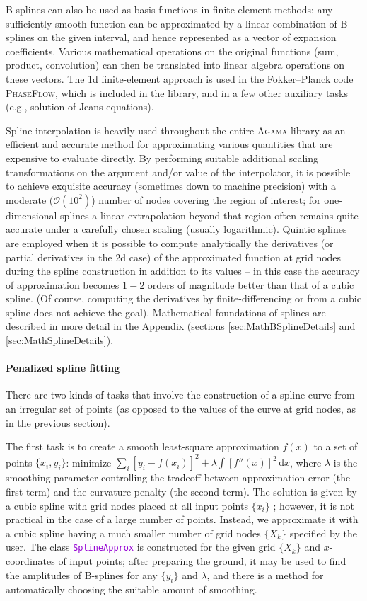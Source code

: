\documentclass[12pt]{article}
\newcommand{\Agama}{\textsc{Agama}\xspace}
\newcommand{\ttt}[1]{\textcolor{darkviolet}{\texttt{#1}}}
\renewcommand{\d}{\mathrm{d}}
\begin{document}
B-splines can also be used as basis functions in finite-element methods: any sufficiently smooth function can be approximated by a linear combination of B-splines on the given interval, and hence represented as a vector of expansion coefficients. Various mathematical operations on the original functions (sum, product, convolution) can then be translated into linear algebra operations on these vectors. The 1d finite-element approach is used in the Fokker--Planck code \textsc{PhaseFlow}, which is included in the library, and in a few other auxiliary tasks (e.g., solution of Jeans equations).

Spline interpolation is heavily used throughout the entire \Agama library as an efficient and accurate method for approximating various quantities that are expensive to evaluate directly. By performing suitable additional scaling transformations on the argument and/or value of the interpolator, it is possible to achieve exquisite accuracy (sometimes down to machine precision) with a moderate ($\mathcal O(10^2)$) number of nodes covering the region of interest; for one-dimensional splines a linear extrapolation beyond that region often remains quite accurate under a carefully chosen scaling (usually logarithmic). Quintic splines are employed when it is possible to compute analytically the derivatives (or partial derivatives in the 2d case) of the approximated function at grid nodes during the spline construction in addition to its values -- in this case the accuracy of approximation becomes $1-2$ orders of magnitude better than that of a cubic spline. (Of course, computing the derivatives by finite-differencing or from a cubic spline does not achieve the goal).
Mathematical foundations of splines are described in more detail in the Appendix (sections \ref{sec:MathBSplineDetails} and \ref{sec:MathSplineDetails}).

\paragraph{Penalized spline fitting}  \label{sec:SplineFitting}
There are two kinds of tasks that involve the construction of a spline curve from an irregular set of points (as opposed to the values of the curve at grid nodes, as in the previous section).

The first task is to create a smooth least-square approximation $f(x)$ to a set of points $\{x_i, y_i\}$: 
minimize $\sum_i [y_i-f(x_i)]^2 + \lambda \int [f''(x)]^2\,\d x$, where $\lambda$ is the smoothing parameter controlling the tradeoff between approximation error (the first term) and the curvature penalty (the second term). The solution is given by a cubic spline with grid nodes placed at all input points $\{x_i\}$ \cite{GreenSilverman}; however, it is not practical in the case of a large number of points. Instead, we approximate it with a cubic spline having a much smaller number of grid nodes $\{X_k\}$ specified by the user. The class \ttt{SplineApprox} is constructed for the given grid  $\{X_k\}$ and $x$-coordinates of input points; after preparing the ground, it may be used to find the amplitudes of B-splines for any $\{y_i\}$ and $\lambda$, and there is a method for automatically choosing the suitable amount of smoothing.
\end{document}
